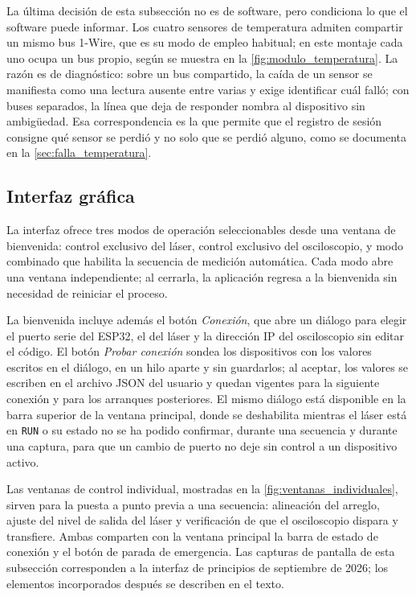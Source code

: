 La última decisión de esta subsección no es de software, pero condiciona
lo que el software puede informar. Los cuatro sensores de temperatura
admiten compartir un mismo bus 1-Wire, que es su modo de empleo
habitual; en este montaje cada uno ocupa un bus propio, según se muestra
en la \cref{fig:modulo_temperatura}. La razón es de diagnóstico: sobre
un bus compartido, la caída de un sensor se manifiesta como una lectura
ausente entre varias y exige identificar cuál falló; con buses
separados, la línea que deja de responder nombra al dispositivo sin
ambigüedad. Esa correspondencia es la que permite que el registro de
sesión consigne qué sensor se perdió y no solo que se perdió alguno,
como se documenta en la \cref{sec:falla_temperatura}.

\subsection{Interfaz gráfica}
\label{sec:gui}

La interfaz ofrece tres modos de operación seleccionables desde una
ventana de bienvenida: control exclusivo del láser, control exclusivo
del osciloscopio, y modo combinado que habilita la secuencia de
medición automática. Cada modo abre una ventana independiente; al
cerrarla, la aplicación regresa a la bienvenida sin necesidad de
reiniciar el proceso.

La bienvenida incluye además el botón \textit{Conexión}, que abre un
diálogo para elegir el puerto serie del ESP32, el del láser y la
dirección IP del osciloscopio sin editar el código. El botón
\textit{Probar conexión} sondea los dispositivos con los valores
escritos en el diálogo, en un hilo aparte y sin guardarlos; al aceptar,
los valores se escriben en el archivo JSON del usuario y quedan
vigentes para la siguiente conexión y para los arranques posteriores.
El mismo diálogo está disponible en la barra superior de la ventana
principal, donde se deshabilita mientras el láser está en
\texttt{RUN} o su estado no se ha podido confirmar, durante una
secuencia y durante una captura, para que un cambio de puerto no deje
sin control a un dispositivo activo.

Las ventanas de control individual, mostradas en la
\cref{fig:ventanas_individuales}, sirven para la puesta a punto previa
a una secuencia: alineación del arreglo, ajuste del nivel de salida del
láser y verificación de que el osciloscopio dispara y transfiere. Ambas
comparten con la ventana principal la barra de estado de conexión y el
botón de parada de emergencia. Las capturas de pantalla de esta
subsección corresponden a la interfaz de principios de septiembre de
2026; los elementos incorporados después se describen en el texto.

